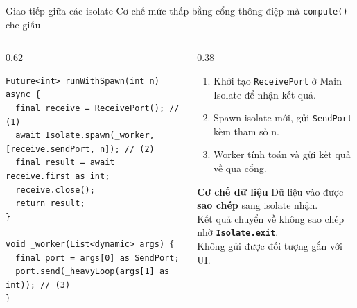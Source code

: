 \documentclass[aspectratio=169,11pt]{beamer}
\newcommand{\cnum}[1]{\textcolor{purpD}{\textbf{(#1)}}}
\begin{document}
\begin{frame}[fragile]{Giao tiếp giữa các isolate}
  \vspace{-0.2cm}
  {\scriptsize\color{grayD} Cơ chế mức thấp bằng cổng thông điệp mà \texttt{compute()} che giấu}
  \vspace{0.05cm}
  \begin{columns}[T]
    \begin{column}{0.62\textwidth}
\begin{lstlisting}[basicstyle=\ttfamily\fontsize{6pt}{7pt}\selectfont]
Future<int> runWithSpawn(int n) async {
  final receive = ReceivePort(); // (1)
  await Isolate.spawn(_worker, [receive.sendPort, n]); // (2)
  final result = await receive.first as int;
  receive.close();
  return result;
}

void _worker(List<dynamic> args) {
  final port = args[0] as SendPort;
  port.send(_heavyLoop(args[1] as int)); // (3)
}
\end{lstlisting}
    \end{column}
    \begin{column}{0.38\textwidth}
      \scriptsize
      \begin{enumerate}
        \setlength{\itemsep}{0.1cm}
        \item[\cnum{1}] Khởi tạo \texttt{ReceivePort} ở Main Isolate để nhận kết quả.
        \item[\cnum{2}] Spawn isolate mới, gửi \texttt{SendPort} kèm tham số n.
        \item[\cnum{3}] Worker tính toán và gửi kết quả về qua cổng.
      \end{enumerate}
      \vspace{0.1cm}
      \begin{block}{\scriptsize\bfseries Cơ chế dữ liệu}
        \tiny
        Dữ liệu vào được \textbf{sao chép} sang isolate nhận.\\
        Kết quả chuyển về không sao chép nhờ \textbf{\texttt{Isolate.exit}}.\\
        Không gửi được đối tượng gắn với UI.
      \end{block}
    \end{column}
  \end{columns}
\end{frame}
\end{document}
